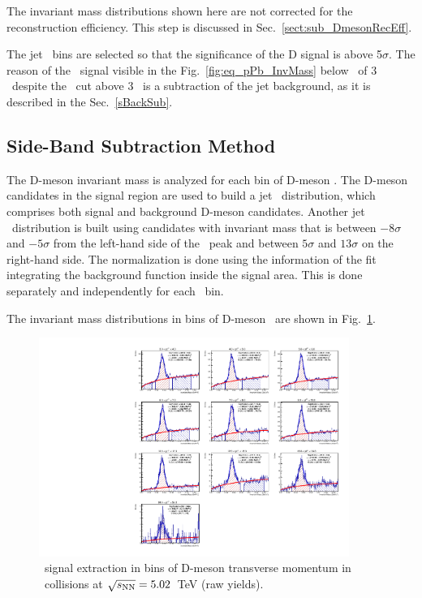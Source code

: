 The invariant mass distributions shown here are not corrected for the reconstruction efficiency. This step is discussed in Sec.~\ref{sect:sub_DmesonRecEff}.

The jet \pt\ bins are selected so that the significance of the D signal is above 5$\sigma$.
The reason of the \Dstar\ signal visible in the Fig.~\ref{fig:eq_pPb_InvMass} below \ptjet\ of 3 \GeVc\ despite the \ptd\ cut above 3 \GeVc\ is a subtraction of the jet background, as it is described in the Sec.~\ref{sBackSub}.


\subsection{Side-Band Subtraction Method}
\label{sub_Bin_d_pT}

The D-meson invariant mass is analyzed for each bin of D-meson \pt. 
The D-meson candidates in the signal region are used to build a jet \pt\ distribution, which comprises both signal and background D-meson candidates.
Another jet \pt\ distribution is built using candidates with invariant mass that is between $-8\sigma$ and $-5\sigma$ from the left-hand side of the \Dstar\ peak and between $5\sigma$ and $13\sigma$ on the right-hand side.
The normalization is done using the information of the fit integrating the background function inside the signal area. This is done separately and independently for each \ptd\ bin.

The invariant mass distributions in bins of D-meson \pt\ are shown in Fig.~\ref{fig:eq_pPb_InvMass_Dbins}.

\begin{figure}[bth]
\centering
\includegraphics[width=0.9\textwidth]{pPbplots/plotsSB_noEff_pt3_noDetails/invMass_FASTwoSDD_pTD3}
\caption{\Dstar\ signal extraction in bins of D-meson transverse momentum in \pPb\ collisions at $\sqrt{s_{\rm NN}}=5.02$~TeV (raw yields).}
\label{fig:eq_pPb_InvMass_Dbins}
\end{figure}

